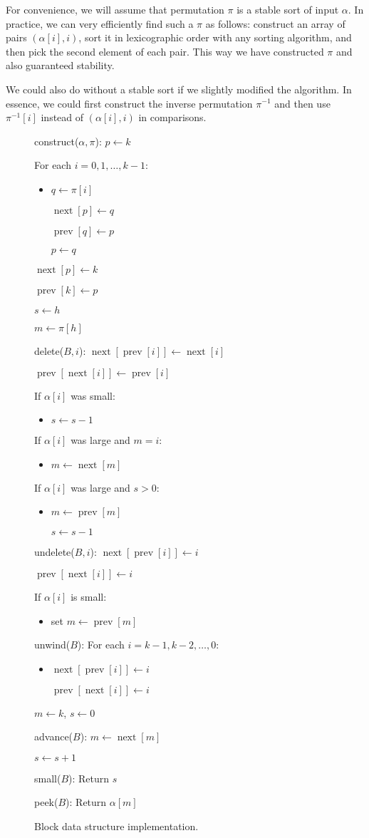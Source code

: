 \documentclass[a4paper,11pt]{article}
\DeclareMathOperator{\prev}{prev}
\DeclareMathOperator{\next}{next}
\newcommand{\algorithm}[2]{\begin{framed}\begin{description}[style=nextline,parsep=2pt,itemsep=9pt,#1]#2
\end{description}\vspace{-4mm}\end{framed}\vspace{-4mm}}
\newcommand{\block}[1]{\begin{itemize}[nolistsep,label=,parsep=2pt,topsep=0pt,leftmargin=10mm]\item #1\end{itemize}\vspace{1pt}}
\begin{document}
For convenience, we will assume that permutation $\pi$ is a stable sort of input $\alpha$. In practice, we can very efficiently find such a $\pi$ as follows: construct an array of pairs $(\alpha[i],i)$, sort it in lexicographic order with any sorting algorithm, and then pick the second element of each pair. This way we have constructed $\pi$ and also guaranteed stability.

We could also do without a stable sort if we slightly modified the algorithm. In essence, we could first construct the inverse permutation $\pi^{-1}$ and then use $\pi^{-1}[i]$ instead of $(\alpha[i],i)$ in comparisons.

\begin{figure}
\algorithm{leftmargin=33mm,itemsep=9pt}{
\item[construct($\alpha, \pi$):]
    $p \gets k$

    For each $i = 0, 1, \dotsc, k-1$: \block{
        $q \gets \pi[i]$
        
        $\next[p] \gets q$
        
        $\prev[q] \gets p$

        $p \gets q$
    }
    
    $\next[p] \gets k$

    $\prev[k] \gets p$

    $s \gets h$

    $m \gets \pi[h]$

\item[delete($B,i$):]
    $\next[\prev[i]] \gets \next[i]$

    $\prev[\next[i]] \gets \prev[i]$

    If $\alpha[i]$ was small: \block{
        $s \gets s - 1$
    }
    
    If $\alpha[i]$ was large and $m = i$: \block{
        $m \gets \next[m]$
    }
    
    If $\alpha[i]$ was large and $s > 0$: \block{
        $m \gets \prev[m]$

        $s \gets s - 1$
    }

\item[undelete($B,i$):]
    $\next[\prev[i]] \gets i$

    $\prev[\next[i]] \gets i$

    If $\alpha[i]$ is small: \block{
        set $m \gets \prev[m]$
    }

\item[unwind($B$):]
    For each $i = k-1, k-2, \dotsc, 0$: \block{
        $\next[\prev[i]] \gets i$

        $\prev[\next[i]] \gets i$
    }

    $m \gets k$, $s \gets 0$

\item[advance($B$):]
    $m \gets \next[m]$

    $s \gets s + 1$

\item[small($B$):]
    Return $s$

\item[peek($B$):]
    Return $\alpha[m]$
}
 \caption{Block data structure implementation.}\label{fig:block-impl}
\end{figure}
\end{document}
